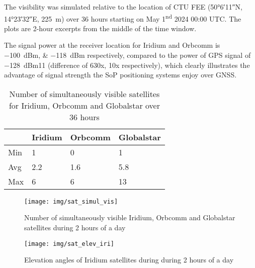 The visibility was simulated relative to the location of CTU FEE (\ang{50;6;11}N, \ang{14;23;32}E, \qty{225}{m}) over 36 hours starting on May 1\textsuperscript{nd} 2024 00:00 UTC. The plots are 2-hour excerpts from the middle of the time window.

The signal power at the receiver location for Iridium and Orbcomm is \qtylist{-100;-118}{dBm} respectively, compared to the power of GPS signal of \qty{-128}{dBm}\citep{pos04}{11} (difference of 630x, 10x respectively), which clearly illustrates the advantage of signal strength the SoP positioning systems enjoy over GNSS.

\begin{table}
    \centering
    \begin{tabular}{llll}
 & Iridium & Orbcomm & Globalstar \\ \hline
Min & 1 & 0 & 1 \\
Avg & 2.2 & 1.6 & 5.8 \\
Max & 6 & 6 & 13 \\
    \end{tabular}
    \caption{Number of simultaneously visible satellites for Iridium, Orbcomm and Globalstar over 36 hours}
    \label{t_sat_simul_vis}
\end{table}

\begin{figure}
    \centering
    \texttt{[image: img/sat\_simul\_vis]}
    \caption{Number of simultaneously visible Iridium, Orbcomm and Globalstar satellites during 2 hours of a day}
    \label{f_sat_simul_vis}
\end{figure}

\begin{figure}
    \centering
    \texttt{[image: img/sat\_elev\_iri]}
    \caption{Elevation angles of Iridium satellites during during 2 hours of a day}
    \label{f_sat_elev_iri}
\end{figure}

